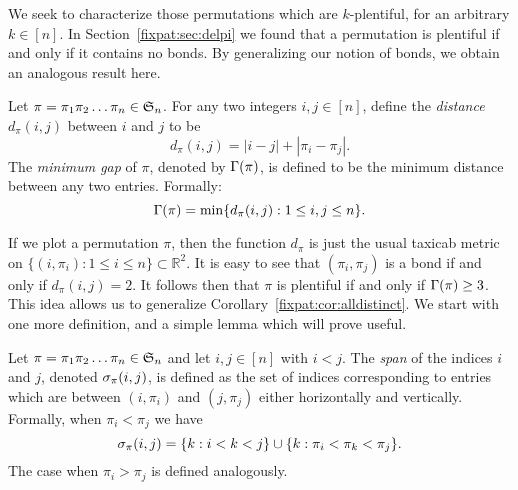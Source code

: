   We seek to characterize those permutations which are $k$-plentiful, for an
  arbitrary $k \in [n]$. In Section~\ref{fixpat:sec:delpi} we found that a
  permutation is plentiful if and only if it contains no bonds. By generalizing
  our notion of bonds, we obtain an analogous result here. 

  \begin{definition} \label{fixpat:def:gap}
    Let $\pi = \pi_1 \pi_2 \dots \pi_n \in \S_n$. For any two integers $i,j
    \in [n]$, define the \emph{distance} $d_\pi(i,j)$ between $i$ and $j$ to be 
    $$ d_\pi(i,j) = |i - j| + |\pi_i - \pi_j|.$$
    The \emph{minimum gap} of $\pi$, denoted by $\Gam(\pi)$, is defined to be
    the minimum distance between any two entries. Formally:
    $$ \Gam(\pi) = \min\{ d_\pi(i,j) : 1 \leq i, j \leq n \}.$$
  \end{definition}

  If we plot a permutation $\pi$, then the function $d_\pi$ is just the usual
  taxicab metric on $\{(i, \pi_i) : 1 \leq i \leq n\} \subset \mathbb{R}^2$. 
  It is easy to see that $(\pi_i, \pi_j)$ is a bond if and only if $d_\pi(i,j)
  = 2$. It follows then that $\pi$ is plentiful if and only if $\Gam(\pi) \geq 3$.
  This idea allows us to generalize Corollary~\ref{fixpat:cor:alldistinct}.  We
  start with one more definition, and a simple lemma which will prove useful. 

  \begin{definition} \label{fixpat:def:span}
    Let $\pi = \pi_1 \pi_2 \dots \pi_n \in \S_n$ and let $i,j \in [n]$ with $i
    < j$. The \emph{span} of the indices $i$ and $j$, denoted
    $\pspan_\pi(i,j)$, is defined as the set of indices corresponding to
    entries which are between $(i,\pi_i)$ and $(j,\pi_j)$ either horizontally
    and vertically. Formally, when $\pi_i < \pi_j$ we have
    $$ 
    \pspan_\pi(i,j) = \{k : i < k < j\} \cup \{k : \pi_i < \pi_k < \pi_j \}.
    $$
    The case when $\pi_i > \pi_j$ is defined analogously. 
  \end{definition}
  

